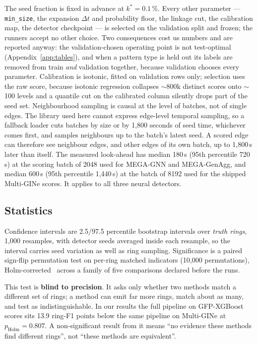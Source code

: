 The seed fraction is fixed in advance at $k^{*}=0.1\,\%$. Every other parameter --- \texttt{min\_size}, the expansion $\Delta t$
and probability floor, the linkage cut, the calibration map, the detector checkpoint --- is
selected on the validation split and frozen; the runners accept no other choice.
Two consequences cost us numbers and are reported anyway: the validation-chosen operating
point is not test-optimal (Appendix~\ref{app:tables}), and when a pattern type is held out
its labels are removed from train \emph{and} validation together, because validation chooses
every parameter. Calibration is isotonic, fitted on validation rows only; selection uses the
raw score, because isotonic regression collapses $\sim$800k distinct scores onto $\sim$100
levels and a quantile cut on the calibrated column silently drops part of the seed set.
Neighbourhood sampling is causal at the level of batches, not of single edges. The library
used here cannot express edge-level temporal sampling, so a fallback loader cuts batches by size
or by 1{,}800 seconds of seed time, whichever comes first, and samples neighbours up to the
batch's latest seed. A scored edge can therefore see neighbour edges, and other edges of its own
batch, up to 1{,}800\,s later than itself. The measured look-ahead has median 180\,s (95th
percentile 720\,s) at the scoring batch of 2048 used for MEGA-GNN and MEGA-GenAgg, and median
600\,s (95th percentile 1{,}440\,s) at the batch of 8192 used for the shipped Multi-GINe scores.
It applies to all three neural detectors.

\subsection{Statistics}
\label{sec:data-stats}

Confidence intervals are 2.5/97.5 percentile bootstrap intervals over \emph{truth rings},
1{,}000 resamples, with detector seeds averaged inside each resample, so the interval carries
seed variation as well as ring sampling.
Significance is a paired sign-flip permutation test on per-ring matched indicators (10{,}000
permutations), Holm-corrected~\citep{holm1979} across a family of five comparisons declared
before the runs.

This test is \textbf{blind to precision}. It asks only whether two methods match a different
set of rings; a method can emit far more rings, match about as many, and test as
indistinguishable. In our results the full pipeline on GFP-XGBoost scores sits 13.9 ring-F1
points below the same pipeline on Multi-GINe at $p_{\mathrm{Holm}}=0.807$.
A non-significant result from it means ``no evidence these methods find different rings'',
not ``these methods are equivalent''.

